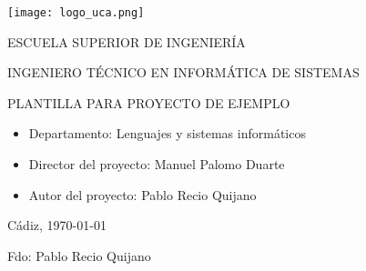 

\begin{center}

  \texttt{[image: logo\_uca.png]} \\

  \vspace{2.0cm}

  \Large{ESCUELA SUPERIOR DE INGENIERÍA} \\

  \vspace{1.0cm}

  \large{INGENIERO TÉCNICO EN INFORMÁTICA DE SISTEMAS} \\

  \vspace{2.0cm}

  \large{PLANTILLA PARA PROYECTO DE EJEMPLO} \\

  \vspace{1.0cm}

\end{center}

\begin{itemize}
\item \large{Departamento: Lenguajes y sistemas informáticos}
\item \large{Director del proyecto: Manuel Palomo Duarte}
\item \large{Autor del proyecto: Pablo Recio Quijano}
\end{itemize}

\vspace{1.0cm}

\begin{flushright}
  \large{Cádiz, \today} \\

  \vspace{2.5cm}

  \large{Fdo: Pablo Recio Quijano}
\end{flushright}
